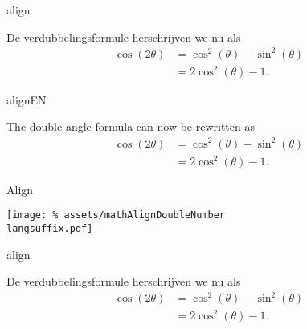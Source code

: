 \copyrightVincent


\begin{saveblock}{align}
    \begin{highlightblock}[gobble=8,linewidth=\textwidth,
        framexleftmargin=0.25em,xleftmargin=0.25em]
        De verdubbelingsformule herschrijven we nu als
        \begin{align}
            \cos(2\theta) &= \cos^2(\theta) - \sin^2(\theta)\\
            &= 2\cos^2(\theta)-1.
        \end{align}
    \end{highlightblock}
\end{saveblock}

\begin{saveblock}{alignEN}
    \begin{highlightblock}[gobble=8,linewidth=\textwidth,
        framexleftmargin=0.25em,xleftmargin=0.25em]
        The double-angle formula can now be rewritten as
        \begin{align}
            \cos(2\theta) &= \cos^2(\theta) - \sin^2(\theta)\\
            &= 2\cos^2(\theta)-1.
        \end{align}
    \end{highlightblock}
\end{saveblock}

\begin{frame}{Align}

    \texttt{[image: \%
        assets/mathAlignDoubleNumber\\langsuffix.pdf]}
\end{frame}


\unless\ifskipNonumber
    \begin{saveblock}{align}
        \begin{highlightblock}[gobble=12,linewidth=\textwidth,
            framexleftmargin=0.25em,xleftmargin=0.25em]
            De verdubbelingsformule herschrijven we nu als
            \begin{align}
                \cos(2\theta) &= \cos^2(\theta) - \sin^2(\theta)
                \nonumber\\
                &= 2\cos^2(\theta)-1.
            \end{align}
        \end{highlightblock}
    \end{saveblock}

